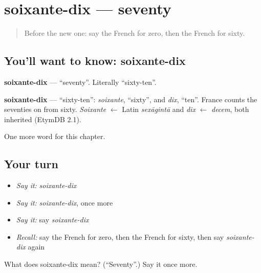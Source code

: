 \section[soixante-dix]{soixante-dix — seventy}

\label{lesson:FR-C136-soixante-dix}



\begin{quote}
Before the new one: say the French for zero, then the French for sixty.
\end{quote}

\subsection*{You'll want to know: soixante-dix}
\textbf{soixante-dix} — \textquotedblleft{}seventy\textquotedblright{}. Literally \textquotedblleft{}sixty-ten\textquotedblright{}.

\begin{cousinweb}
\textbf{soixante-dix} — \textquotedblleft{}sixty-ten\textquotedblright{}: \emph{soixante}, \textquotedblleft{}sixty\textquotedblright{}, and \emph{dix}, \textquotedblleft{}ten\textquotedblright{}. France counts the seventies on from sixty. \emph{Soixante} $\leftarrow$ Latin \emph{sexāgintā} and \emph{dix} $\leftarrow$ \emph{decem}, both inherited (EtymDB 2.1).
\end{cousinweb}

\begin{grammarlens}[title={What you've built}]
One more word for this chapter.
\end{grammarlens}

\subsection*{Your turn}
\begin{itemize}
\raggedright
  \item \emph{Say it:} \emph{soixante-dix}
  \item \emph{Say it:} \emph{soixante-dix}, once more
  \item \emph{Say it:} say \emph{soixante-dix}
  \item \emph{Recall:} say the French for zero, then the French for sixty, then say \emph{soixante-dix} again
\end{itemize}

\begin{tcolorbox}[breakable,colback=teal!4,colframe=teal!35!black,title={Before you move on}]
What does soixante-dix mean? (\textquotedblleft{}Seventy\textquotedblright{}.) Say it once more.
\end{tcolorbox}
